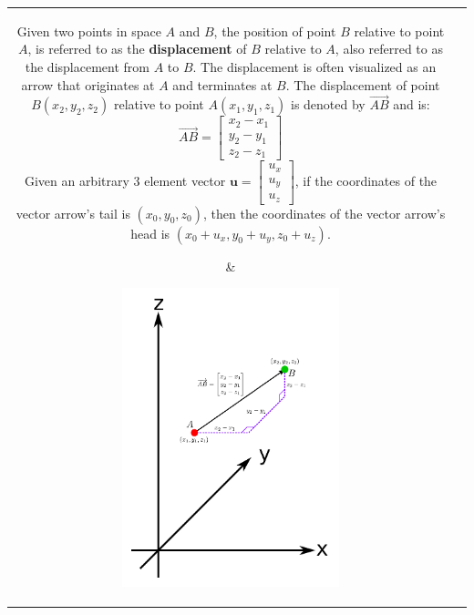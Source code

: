 \documentclass{article}
\begin{document}
\begin{tabular}{cc}
\parbox{0.5\textwidth}{
Given two points in space \(A\) and \(B\), the position of point \(B\) relative to point \(A\), is referred to as the {\bf displacement} of \(B\) relative to \(A\), also referred to as the displacement from \(A\) to \(B\). The displacement is often visualized as an arrow that originates at \(A\) and terminates at \(B\). The displacement of point \(B(x_2, y_2, z_2)\) relative to point \(A(x_1, y_1, z_1)\) is denoted by \(\overrightarrow{AB}\) and is:
\[\overrightarrow{AB} = \begin{bmatrix} x_2 - x_1 \\ y_2 - y_1 \\ z_2 - z_1 \end{bmatrix}\]
Given an arbitrary \(3\) element vector \(\mathbf{u} = \begin{bmatrix} u_x \\ u_y \\ u_z \end{bmatrix}\), if the coordinates of the vector arrow's tail is \((x_0, y_0, z_0)\), then the coordinates of the vector arrow's head is \((x_0 + u_x, y_0 + u_y, z_0 + u_z)\).
} & \parbox{0.5\textwidth}{
\includegraphics[width = 0.5\textwidth]{displacement_vector}
}
\end{tabular}
\end{document}
